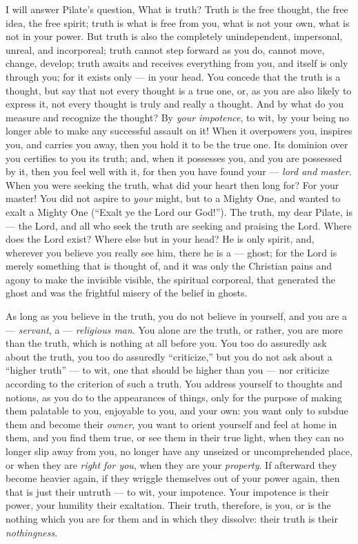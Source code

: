 I will answer Pilate's question, What is truth? Truth is the free thought, the 
free idea, the free spirit; truth is what is free from you, what is not your 
own, what is not in your power. But truth is also the completely 
unindependent, impersonal, unreal, and incorporeal; truth cannot step forward 
as you do, cannot move, change, develop; truth awaits and receives everything 
from you, and itself is only through you; for it exists only --- in your head. 
You concede that the truth is a thought, but say that not every thought is a 
true one, or, as you are also likely to express it, not every thought is truly 
and really a thought. And by what do you measure and recognize the thought? By 
\textit{your impotence}, to wit, by your being no longer able to make any 
successful assault on it! When it overpowers you, inspires you, and carries 
you away, then you hold it to be the true one. Its dominion over you certifies 
to you its truth; and, when it possesses you, and you are possessed by it, 
then you feel well with it, for then you have found your --- \textit{lord and 
master}. When you were seeking the truth, what did your heart then long for? 
For your master! You did not aspire to \textit{your} might, but to a Mighty 
One, and wanted to exalt a Mighty One (``Exalt ye the Lord our God!''). The 
truth, my dear Pilate, is --- the Lord, and all who seek the truth are seeking 
and praising the Lord. Where does the Lord exist? Where else but in your head? 
He is only spirit, and, wherever you believe you really see him, there he is a --- ghost; for the Lord is merely something that is thought of, and it was only 
the Christian pains and agony to make the invisible visible, the spiritual 
corporeal, that generated the ghost and was the frightful misery of the belief 
in ghosts.

As long as you believe in the truth, you do not believe in yourself, and you 
are a --- \textit{servant}, a --- \textit{religious man}. You alone are the 
truth, or rather, you are more than the truth, which is nothing at all before 
you. You too do assuredly ask about the truth, you too do assuredly 
``criticize,'' but you do not ask about a ``higher truth'' --- to wit, one 
that should be higher than you --- nor criticize according to the criterion of 
such a truth. You address yourself to thoughts and notions, as you do to the 
appearances of things, only for the purpose of making them palatable to you, 
enjoyable to you, and your own: you want only to subdue them and become their 
\textit{owner}, you want to orient yourself and feel at home in them, and you 
find them true, or see them in their true light, when they can no longer slip 
away from you, no longer have any unseized or uncomprehended place, or when 
they are \textit{right for you}, when they are your \textit{property}. If 
afterward they become heavier again, if they wriggle themselves out of your 
power again, then that is just their untruth --- to wit, your impotence. Your 
impotence is their power, your humility their exaltation. Their truth, 
therefore, is you, or is the nothing which you are for them and in which they 
dissolve: their truth is their \textit{nothingness}.

